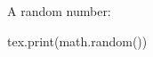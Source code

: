 \documentclass{article}
\begin{document}
A random number:
\begin{luacode}
tex.print(math.random())
\end{luacode}
\end{document}
